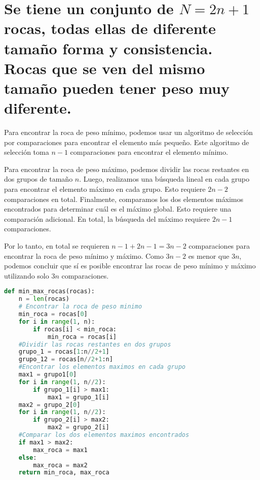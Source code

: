 \section{Se tiene un conjunto de $N = 2n + 1$ rocas, todas ellas de diferente
tamaño forma y consistencia. Rocas que se ven del mismo tamaño pueden tener peso muy diferente.}

Para encontrar la roca de peso mínimo, podemos usar un algoritmo de selección por comparaciones para encontrar el elemento más pequeño. Este algoritmo de selección toma $n-1$ comparaciones para encontrar el elemento mínimo.

Para encontrar la roca de peso máximo, podemos dividir las rocas restantes en dos grupos de tamaño $n$. Luego, realizamos una búsqueda lineal en cada grupo para encontrar el elemento máximo en cada grupo. Esto requiere $2n-2$ comparaciones en total. Finalmente, comparamos los dos elementos máximos encontrados para determinar cuál es el máximo global. Esto requiere una comparación adicional. En total, la búsqueda del máximo requiere $2n-1$ comparaciones.

Por lo tanto, en total se requieren $n-1 + 2n-1 = 3n-2$ comparaciones para encontrar la roca de peso mínimo y máximo. Como $3n-2$ es menor que $3n$, podemos concluir que sí es posible encontrar las rocas de peso mínimo y máximo utilizando solo $3n$ comparaciones.

\begin{lstlisting}[language=python]
def min_max_rocas(rocas):
    n = len(rocas)
    # Encontrar la roca de peso minimo 
    min_roca = rocas[0]
    for i in range(1, n):
        if rocas[i] < min_roca:
            min_roca = rocas[i]
    #Dividir las rocas restantes en dos grupos
    grupo_1 = rocas[1:n//2+1]
    grupo_12 = rocas[n//2+1:n]
    #Encontrar los elementos maximos en cada grupo
    max1 = grupo1[0]
    for i in range(1, n//2):
        if grupo_1[i] > max1:
            max1 = grupo_1[i]
    max2 = grupo_2[0]
    for i in range(1, n//2):
        if grupo_2[i] > max2:
            max2 = grupo_2[i]
    #Comparar los dos elementos maximos encontrados
    if max1 > max2:
        max_roca = max1
    else:
        max_roca = max2
    return min_roca, max_roca
\end{lstlisting}
